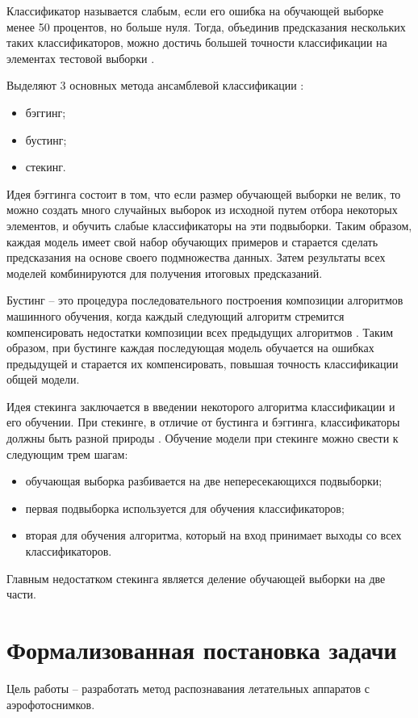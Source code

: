 Классификатор называется слабым, если его ошибка на обучающей выборке менее 50 процентов, но больше нуля. Тогда, объединив предсказания нескольких таких классификаторов, можно достичь большей точности классификации на элементах тестовой выборки \cite{ansambles}.

Выделяют 3 основных метода ансамблевой классификации \cite{ansambles}:
\begin{itemize}
	\item бэггинг;
	\item бустинг;
	\item стекинг.
\end{itemize}

Идея бэггинга состоит в том, что если размер обучающей выборки не велик, то можно создать много случайных выборок из исходной путем отбора некоторых элементов, и обучить слабые классификаторы на эти подвыборки. Таким образом, каждая модель имеет свой набор обучающих примеров и старается сделать предсказания на основе своего подмножества данных. Затем результаты всех моделей комбинируются для получения итоговых предсказаний.

Бустинг -- это процедура последовательного построения композиции алгоритмов машинного обучения, когда каждый следующий алгоритм стремится компенсировать недостатки композиции всех предыдущих алгоритмов \cite{ansambles}. Таким образом, при бустинге каждая последующая модель обучается на ошибках предыдущей и старается их компенсировать, повышая точность классификации общей модели.

Идея стекинга заключается в введении некоторого алгоритма классификации и его обучении. При стекинге, в отличие от бустинга и бэггинга, классификаторы должны быть разной природы \cite{ansambles}. Обучение модели при стекинге можно свести к следующим трем шагам:
\begin{itemize}
	\item обучающая выборка разбивается на две непересекающихся подвыборки;
	\item первая подвыборка используется для обучения классификаторов;
	\item вторая для обучения алгоритма, который на вход принимает выходы со всех классификаторов.
\end{itemize}

Главным недостатком стекинга является деление обучающей выборки на две части.

\section{Формализованная постановка задачи}
Цель работы -- разработать метод распознавания летательных аппаратов с аэрофотоснимков.

